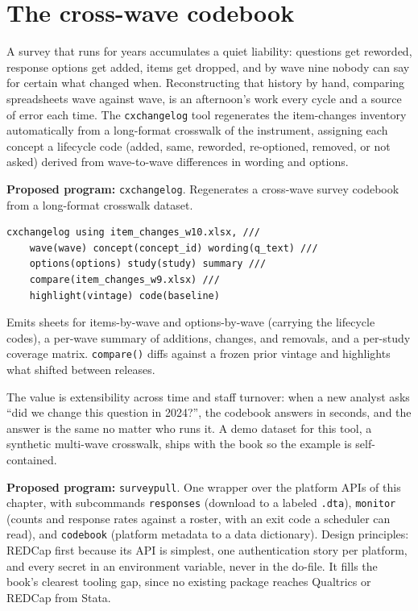 \documentclass[
    a4paper,
    fontsize=10pt,
    twoside=true,
    numbers=noenddot,
]{kaobook}
\begin{document}
\section{The cross-wave codebook}\label{sec:cxchangelog}
A survey that runs for years accumulates a quiet liability: questions get reworded, response options get added, items get dropped, and by wave nine nobody can say for certain what changed when. Reconstructing that history by hand, comparing spreadsheets wave against wave, is an afternoon's work every cycle and a source of error each time. The \texttt{cxchangelog} tool regenerates the item-changes inventory automatically from a long-format crosswalk of the instrument, assigning each concept a lifecycle code (added, same, reworded, re-optioned, removed, or not asked) derived from wave-to-wave differences in wording and options.

\begin{kaobox}[frametitle=Ado-file Idea: \texttt{cxchangelog}]
\textbf{Proposed program:} \texttt{cxchangelog}. Regenerates a cross-wave survey codebook from a long-format crosswalk dataset.
{\footnotesize
\begin{verbatim}
cxchangelog using item_changes_w10.xlsx, ///
    wave(wave) concept(concept_id) wording(q_text) ///
    options(options) study(study) summary ///
    compare(item_changes_w9.xlsx) ///
    highlight(vintage) code(baseline)
\end{verbatim}
}
Emits sheets for items-by-wave and options-by-wave (carrying the lifecycle codes), a per-wave summary of additions, changes, and removals, and a per-study coverage matrix. \texttt{compare()} diffs against a frozen prior vintage and highlights what shifted between releases.
\end{kaobox}

The value is extensibility across time and staff turnover: when a new analyst asks \enquote{did we change this question in 2024?}, the codebook answers in seconds, and the answer is the same no matter who runs it. A demo dataset for this tool, a synthetic multi-wave crosswalk, ships with the book so the example is self-contained. %

\begin{kaobox}[frametitle=Ado-file Idea: \texttt{surveypull}]
\textbf{Proposed program:} \texttt{surveypull}. One wrapper over the platform APIs of this chapter, with subcommands \texttt{responses} (download to a labeled \texttt{.dta}), \texttt{monitor} (counts and response rates against a roster, with an exit code a scheduler can read), and \texttt{codebook} (platform metadata to a data dictionary). Design principles: REDCap first because its API is simplest, one authentication story per platform, and every secret in an environment variable, never in the do-file. It fills the book's clearest tooling gap, since no existing package reaches Qualtrics or REDCap from Stata.
\end{kaobox}
\end{document}
